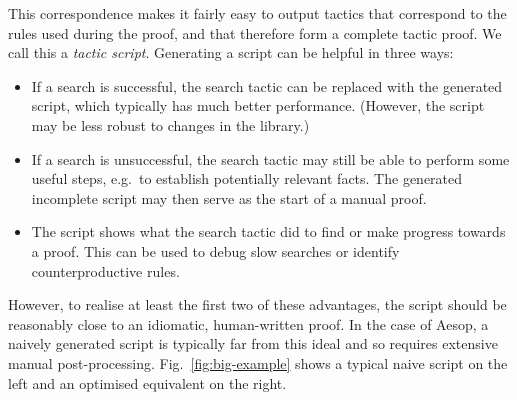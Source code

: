 \documentclass[sigplan,screen]{acmart}
\begin{document}
This correspondence makes it fairly easy to output tactics that correspond to the rules used during the proof, and that therefore form a complete tactic proof.
We call this a \emph{tactic script}.
Generating a script can be helpful in three ways:
\begin{itemize}
  \item If a search is successful, the search tactic can be replaced with the generated script, which typically has much better performance.
        (However, the script may be less robust to changes in the library.)
  \item If a search is unsuccessful, the search tactic may still be able to perform some useful steps, e.g.\ to establish potentially relevant facts.
        The generated incomplete script may then serve as the start of a manual proof.
  \item The script shows what the search tactic did to find or make progress towards a proof.
        This can be used to debug slow searches or identify counterproductive rules.
\end{itemize}

However, to realise at least the first two of these advantages, the script should be reasonably close to an idiomatic, human-written proof.
In the case of Aesop, a naively generated script is typically far from this ideal and so requires extensive manual post-processing.
Fig.~\ref{fig:big-example} shows a typical naive script on the left and an optimised equivalent on the right.
\end{document}
